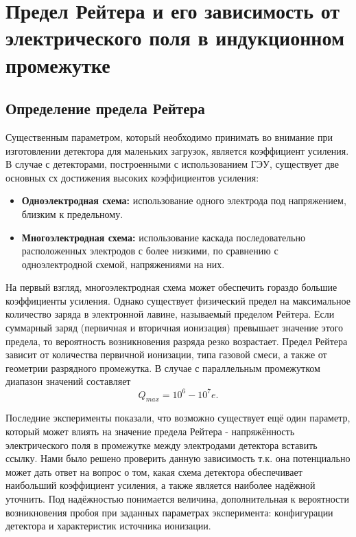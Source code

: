 \section{Предел Рейтера и его зависимость от электрического поля в индукционном промежутке}
\label{sec:raether_exp}
\subsection{Определение предела Рейтера}
Существенным параметром, который необходимо принимать во внимание при изготовлении детектора для маленьких загрузок, является коэффициент усиления. В случае с детекторами, построенными с использованием ГЭУ, существует две основных сх достижения высоких коэффициентов усиления: 
\begin{itemize}
	\item\textbf{Одноэлектродная схема:} использование одного электрода под напряжением, близким к предельному.
	\item\textbf{Многоэлектродная схема:} использование каскада последовательно расположенных электродов с более низкими, по сравнению с одноэлектродной схемой, напряжениями на них. 
\end{itemize}
\par На первый взгляд, многоэлектродная схема может обеспечить гораздо большие коэффициенты усиления. Однако существует физический предел на максимальное количество заряда в электронной лавине, называемый пределом Рейтера. Если суммарный заряд (первичная и вторичная ионизация) превышает значение этого предела, то вероятность возникновения разряда резко возрастает. Предел Рейтера зависит от количества первичной ионизации, типа газовой смеси, а также от геометрии разрядного промежутка. 
В случае с параллельным промежутком диапазон значений составляет \cite{Peskov}
\begin{equation}
Q_{max} = 10^6-10^7e.
\end{equation} 
\par Последние эксперименты показали, что возможно существует ещё один параметр, который может влиять на значение предела Рейтера - напряжённость электрического поля в промежутке между электродами детектора {вставить ссылку}. Нами было решено проверить данную зависимость т.к. она потенциально может дать ответ на вопрос о том, какая схема детектора обеспечивает наибольший коэффициент усиления, а также является наиболее надёжной {уточнить}. Под надёжностью понимается величина, дополнительная к вероятности возникновения пробоя при заданных параметрах эксперимента: конфигурации детектора и характеристик источника ионизации. 
